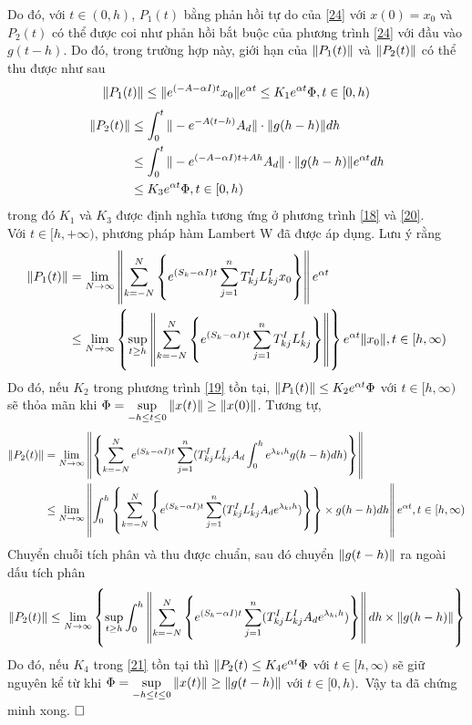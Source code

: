 \begin{cm}
Do đó, với $t \in (0,h)$, $P_1(t)$ bằng phản hồi tự do của \eqref{24} với $x(0) =x_0$ và $P_2(t)$ có thể được coi như phản hồi bắt buộc của phương trình \eqref{24} với đầu vào $g(t-h)$. Do đó,  trong trường hợp này, giới hạn của $\Vert P_1(t) \Vert$ và $\Vert P_2(t) \Vert$ có thể thu được như sau
\begin{align}\label{25}
	\Vert P_1(t) \Vert \le \Vert e^{(-A - \alpha I)t}x_0 \Vert e^{\alpha t} \le K_1 e^{\alpha t}\Phi, t \in [0,h)
\end{align}
\begin{align}\label{26}
	\Vert P_2(t) \Vert &\le \int_{0}^{t}\Vert -e^{-A(t-h )}A_d \Vert \cdot \Vert g(h  - h) \Vert dh  \notag\\
	&\le \int_{0}^{t}\Vert -e^{(-A - \alpha I)t + Ah }A_d \Vert \cdot \Vert g(h  - h) \Vert e^{\alpha t}dh  \notag\\
	&\le K_3e^{\alpha t}	\Phi, t \in [0,h)
\end{align}
trong đó $K_1$ và $K_3$ được định nghĩa tương ứng ở phương trình \eqref{18} và \eqref{20}.\\
Với $t\in [h,+\infty)$, phương pháp hàm Lambert W đã được áp dụng. Lưu ý rằng
\begin{align}\label{27}
	\Vert P_1(t) \Vert &= \lim\limits_{N \to \infty} \left \Vert \sum_{k=-N}^{N} \left\{ e^{(S_k-\alpha I)t} \sum_{j =1}^n T^I_{kj}L^I_{kj}x_0\right\} \right \Vert e^{\alpha t} \notag\\
	& \le \lim \limits_{N \to \infty} \left\{ \sup \limits_{t \ge h} \left \Vert \sum_{k=-N}^{N} \left\{ e^{(S_k - \alpha I)t} \sum_{j =1}^n T^I_{kj} L^I_{kj}\right\} \right \Vert\right\} e^{\alpha t} \Vert x_0 \Vert, t \in [h,\infty)
\end{align}
Do đó, nếu $K_2$ trong phương trình \eqref{19} tồn tại, $\Vert P_1(t) \Vert \le K_2 e^{\alpha t} \Phi$ với $t \in [h,\infty)$ sẽ thỏa mãn khi $\Phi = \sup \limits_{-h \le t \le 0} \Vert x(t)\Vert \ge \Vert x(0)\Vert$. Tương tự,
\begin{align}\label{28}
	\Vert P_2(t)\Vert &= \lim\limits_{N \to \infty} \left \Vert \left\{  \sum_{k=-N}^N e^{(S_k - \alpha I)t} \sum_{j =1}^n (T^I_{kj}L^I_{kj}A_d \int_0^h e^{\lambda_{ki}h } g(h  - h) dh )  \right\} \right \Vert \notag\\
	& \le \lim\limits_{N\to \infty} \left \Vert \int_0^h \left\{ \sum_{k=-N}^N \left\{ e^{(S_k - \alpha I)t} \sum_{j=1}^n (T^I_{kj} L^I_{kj}A_de^{\lambda_{ki}h })\right\}\right\} \times g(h  - h) d h  \right \Vert e^{\alpha t}, t \in [h,\infty)
	\end{align}
Chuyển chuỗi tích phân và thu được chuẩn, sau đó chuyển $\Vert g(t-h)\Vert$ ra ngoài dấu tích phân
\begin{align}\label{29}
	\Vert P_2(t) \Vert \le \lim \limits_{N\to \infty} \left \{ \sup \limits_{t \ge h} \int_0^h \left \Vert \sum_{k=-N}^N \left\{ e^{(S_k - \alpha I)t} \sum_{j =1}^n (T^I_{kj}L^I_{kj}A_de^{\lambda_{ki}h })\right\} \right \Vert dh  \times \Vert g(h  - h)\Vert \right\}
\end{align}
Do đó, nếu $K_4$ trong \eqref{21} tồn tại thì $\Vert P_2(t) \le K_4e^{\alpha t} \Phi$ với $t \in [h,\infty)$ sẽ giữ nguyên kể từ khi $\Phi = \sup \limits_{-h \le t \le 0} \Vert x(t) \Vert \ge \Vert g(t-h)\Vert$ với $t \in [0,h)$.\ 
Vậy ta đã chứng minh xong. $\hfill \square$
\end{cm}

